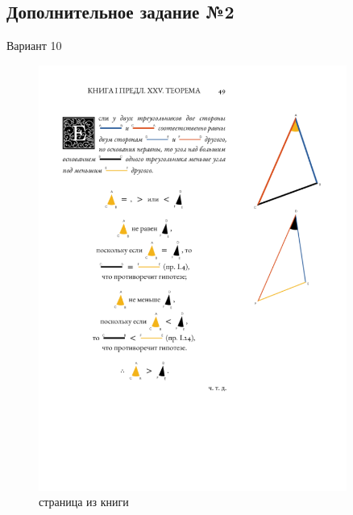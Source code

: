 \documentclass[a4paper]{article}
\begin{document}
	\newpage
	\subsection{Дополнительное задание №2}
		Вариант 10\\
		\begin{figure}[h]
			\centering
			\includegraphics[width=0.9\textwidth]{dop2.png}
			\caption{страница из книги}
			\label{fig:dop2}
		\end{figure}
		
\end{document}
